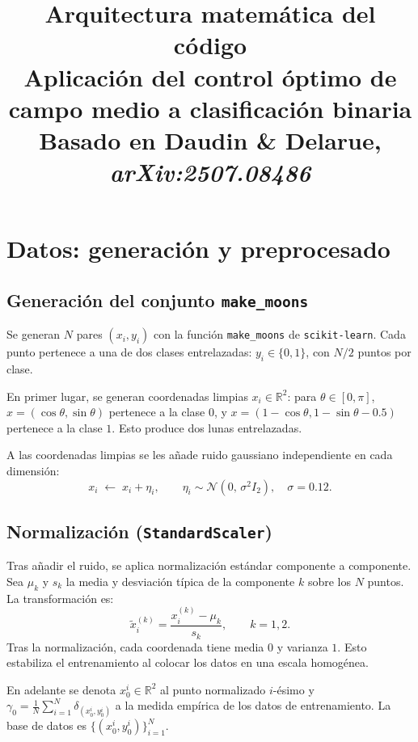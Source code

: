 \documentclass[11pt, a4paper]{article}
\title{\textbf{Arquitectura matemática del código}\\[0.5em]
\large Aplicación del control óptimo de campo medio a clasificación binaria\\
\normalsize Basado en Daudin \& Delarue, \textit{arXiv:2507.08486}}
\date{}
\date{}
\theoremstyle{definition}
\newcommand{\R}{\mathbb{R}}
\begin{document}
\maketitle
\tableofcontents
\newpage

\section{Datos: generación y preprocesado}
\label{sec:datos}

\subsection{Generación del conjunto \texttt{make\_moons}}

Se generan $N$ pares $(x_i, y_i)$ con la función \texttt{make\_moons} de
\texttt{scikit-learn}. Cada punto pertenece a una de dos clases entrelazadas:
$y_i \in \{0, 1\}$, con $N/2$ puntos por clase.

En primer lugar, se generan coordenadas limpias $x_i \in \R^2$: para $\theta \in [0, \pi]$, 
$x = (\cos \theta, \sin \theta)$ pertenece a la clase $0$, y $x = (1 - \cos \theta, 1 - \sin \theta - 0.5)$ 
pertenece a la clase $1$. Esto produce dos lunas entrelazadas.

A las coordenadas limpias se les añade ruido gaussiano independiente en cada
dimensión:
\begin{equation}
  x_i \;\leftarrow\; x_i + \eta_i, \qquad
  \eta_i \sim \mathcal{N}(0,\, \sigma^2 I_2), \quad \sigma = 0.12.
\end{equation}

\subsection{Normalización (\texttt{StandardScaler})}

Tras añadir el ruido, se aplica normalización estándar componente a componente.
Sea $\mu_k$ y $s_k$ la media y desviación típica de la componente $k$ sobre los
$N$ puntos. La transformación es:
\begin{equation}
  \tilde{x}_i^{(k)} = \frac{x_i^{(k)} - \mu_k}{s_k}, \qquad k = 1, 2.
\end{equation}
Tras la normalización, cada coordenada tiene media $0$ y varianza $1$. Esto
estabiliza el entrenamiento al colocar los datos en una escala homogénea.

En adelante se denota $x_0^{i} \in \R^2$ al punto normalizado $i$-ésimo y
$\gamma_0 = \frac{1}{N}\sum_{i=1}^N \delta_{(x_0^{i}, y_0^{i})}$ a la medida
empírica de los datos de entrenamiento. La base de datos es $\{(x_0^{i}, y_0^{i})\}_{i=1}^N$.
\end{document}

